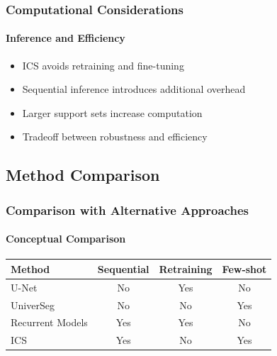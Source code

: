 \documentclass[nometaot,lecture,amberg,autotoc,toc=twocolumn,indicatelastpageofframe,footlinebox]{OTHAWbeamer}
\begin{document}
\begin{frame}
    \frametitle{Computational Considerations}
    \framesubtitle{Inference and Efficiency}

    \begin{itemize}
        \item ICS avoids retraining and fine-tuning
        \item Sequential inference introduces additional overhead
        \item Larger support sets increase computation
        \item Tradeoff between robustness and efficiency
    \end{itemize}

\end{frame}

\subsection{Method Comparison}

\begin{frame}
    \frametitle{Comparison with Alternative Approaches}
    \framesubtitle{Conceptual Comparison}

    \begin{table}
    \centering
    \begin{tabular}{lccc}
        \toprule
        Method & Sequential & Retraining & Few-shot \\
        \midrule
        U-Net & No & Yes & No \\
        UniverSeg & No & No & Yes \\
        Recurrent Models & Yes & Yes & No \\
        ICS & Yes & No & Yes \\
        \bottomrule
    \end{tabular}
    \end{table}

\end{frame}
\end{document}
